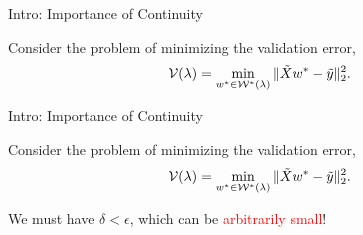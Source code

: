 \documentclass[usenames,dvipsnames,mathserif,notheorems]{beamer}
\newcommand{\red}[1]{\textcolor{Red}{#1}}
\begin{document}
\begin{frame}{Intro: Importance of Continuity}

	Consider the problem of minimizing the validation error,
	\[
		\mathcal{V}(\lambda) = \min_{w^* \in \mathcal{W}^*(\lambda)} \|\tilde X w^* - \tilde y\|_2^2.
	\]

	\pause

	\begin{figure}[]
		\centering
		
	\end{figure}

\end{frame}

\begin{frame}{Intro: Importance of Continuity}

	Consider the problem of minimizing the validation error,
	\[
		\mathcal{V}(\lambda) = \min_{w^* \in \mathcal{W}^*(\lambda)} \|\tilde X w^* - \tilde y\|_2^2.
	\]

	\begin{figure}[]
		\centering
		
	\end{figure}

	\pause
	We must have \( \delta < \epsilon \),
	which can be \red{arbitrarily small}!

\end{frame}
\end{document}
